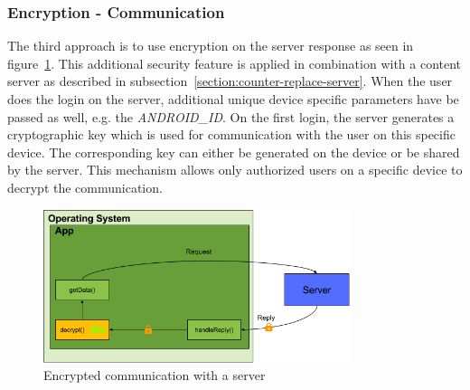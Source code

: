 \subsubsection{Encryption - Communication} \label{section:counter-replace-encryption-content-communication}
The third approach is to use encryption on the server response as seen in figure~\ref{fig:encryptionComm}.
This additional security feature is applied in combination with a content server as described in subsection~\ref{section:counter-replace-server}.
\newline
When the user does the login on the server, additional unique device specific parameters have be passed as well, e.g. the \textit{ANDROID\_ID}.
On the first login, the server generates a cryptographic key which is used for communication with the user on this specific device.
The corresponding key can either be generated on the device or be shared by the server.
This mechanism allows only authorized users on a specific device to decrypt the communication.
\newline
\begin{figure}[h]
    \centering
    \includegraphics[width=0.8\textwidth]{data/encryptionComm.png}
    \caption{Encrypted communication with a server}
    \label{fig:encryptionComm}
\end{figure}
